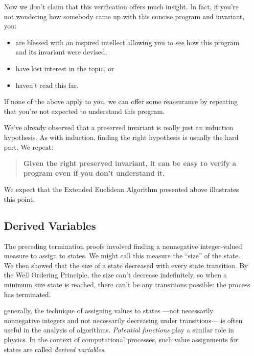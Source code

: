 Now we don't claim that this verification offers much insight.  In fact,
if you're not wondering how somebody came up with this concise program and
invariant, you:
\begin{itemize}

\item are blessed with an inspired intellect allowing you to see how this
  program and its invariant were devised,

\item have lost interest in the topic, or

\item haven't read this far.

\end{itemize}
If none of the above apply to you, we can offer some reassurance by
repeating that you're not expected to understand this program.

We've already observed that a preserved invariant is really just an
induction hypothesis.  As with induction, finding the right hypothesis
is usually the hard part.  We repeat:
\begin{quote}
  \textbf{Given the right preserved invariant, it can be easy to verify a
    program even if you don't understand it.}
\end{quote}
We expect that the Extended Euclidean Algorithm presented above
illustrates this point.

\subsection{Derived Variables}\label{derived_var_subsec}

The preceding termination proofs involved finding a nonnegative
integer-valued measure to assign to states.  We might call this measure
the ``size'' of the state.  We then showed that the size of a state
decreased with every state transition.  By the Well Ordering Principle,
the size can't decrease indefinitely, so when a minimum size state is
reached, there can't be any transitions possible: the process has
terminated.

 generally, the technique of assigning
values to states ---not necessarily nonnegative integers and not necessarily
decreasing under transitions--- is often useful in the analysis of
algorithms.  \emph{Potential functions} play a similar role in physics.
In the context of computational processes, such value assignments for
states are called \emph{derived variables}.

